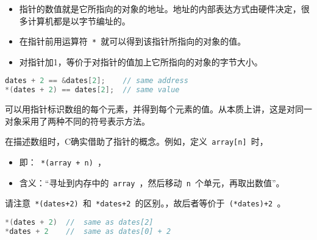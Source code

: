 \begin{frame}[fragile]\ft{\secname}
\begin{center}
\end{center}
\begin{itemize}
\item 
指针的数值就是它所指向的对象的地址。地址的内部表达方式由硬件决定，很多计算机都是以字节编址的。 \\[0.1in]
\item
在指针前用运算符\lstinline| * |就可以得到该指针所指向的对象的值。\\[0.1in]
\item
对指针加1，等价于对指针的值加上它所指向的对象的字节大小。
\end{itemize}
\end{frame}


\begin{frame}[fragile]\ft{\secname}
\begin{lstlisting}[language=c,backgroundcolor=\color{red!20}]
dates + 2 == &dates[2];    // same address
*(dates + 2) == dates[2];  // same value
\end{lstlisting}

可以用指针标识数组的每个元素，并得到每个元素的值。从本质上讲，这是对同一对象采用了两种不同的符号表示方法。

\end{frame}


\begin{frame}[fragile]\ft{\secname}
在描述数组时，C确实借助了指针的概念。例如，定义\lstinline| array[n] |时，\vspace{0.1in}

\begin{itemize}
\item
即：\lstinline| *(array + n) |， \\[0.1in]
\item
含义：“寻址到内存中的\lstinline| array |，然后移动\lstinline| n |个单元，再取出数值”。
\end{itemize}
\end{frame}


\begin{frame}[fragile]\ft{\secname}
请注意\lstinline| *(dates+2) |和\lstinline| *dates+2 |的区别。，故后者等价于\lstinline| (*dates)+2 |。\vspace{0.1in}

\begin{lstlisting}[language=c,backgroundcolor=\color{red!20}]
*(dates + 2)  //  same as dates[2]
*dates + 2    //  same as dates[0] + 2
\end{lstlisting}
\end{frame}
 

